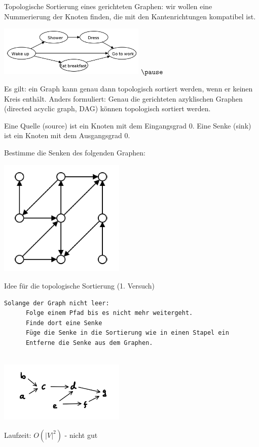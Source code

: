 \begin{frame}[fragile] 
Topologische Sortierung eines gerichteten Graphen: wir wollen eine Nummerierung der Knoten finden, die mit den Kantenrichtungen
kompatibel ist.

\includegraphics[width=7cm]{bild9.png} $\pause$         

Es gilt: ein Graph kann genau dann topologisch sortiert werden, wenn er keinen Kreis enthält.
Anders formuliert: Genau die gerichteten azyklischen Graphen (directed acyclic graph, DAG) können topologisch sortiert werden. 

\end{frame}

\begin{frame}[fragile] 
Eine Quelle (source) ist ein Knoten mit dem Eingangsgrad 0. Eine Senke (sink) ist ein Knoten mit dem Ausgangsgrad 0.

Bestimme die Senken des folgenden Graphen:

\includegraphics[width=6cm]{bild10.png}

\end{frame}

\begin{frame}[fragile] 

Idee für die topologische Sortierung (1. Versuch)
\begin{lstlisting} 
Solange der Graph nicht leer:
      Folge einem Pfad bis es nicht mehr weitergeht.
      Finde dort eine Senke
      Füge die Senke in die Sortierung wie in einen Stapel ein
      Entferne die Senke aus dem Graphen.


\end{lstlisting} 
\includegraphics[width=6cm]{bild12.png}

Laufzeit: \pause $O(\left|V\right|^2)$    -   nicht gut

\end{frame}

